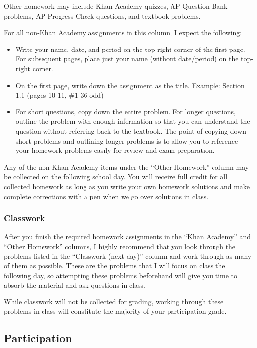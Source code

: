 \documentclass[12pt,fleqn]{article}
\begin{document}
Other homework may include Khan Academy quizzes, AP Question Bank problems, AP Progress Check questions, and textbook problems.

For all non-Khan Academy assignments in this column, I expect the following:

\begin{itemize}
\item
  Write your name, date, and period on the top-right corner of the first page. For subsequent pages, place just your name (without date/period) on the top-right corner.
\item
  On the first page, write down the assignment as the title. Example: Section 1.1 (pages 10-11, \#1-36 odd)
\item
  For short questions, copy down the entire problem. For longer questions, outline the problem with enough information so that you can understand the question without referring back to the textbook. The point of copying down short problems and outlining longer problems is to allow you to reference your homework problems easily for review and exam preparation.
\end{itemize}

Any of the non-Khan Academy items under the ``Other Homework'' column may be collected on the following school day. You will receive full credit for all collected homework as long as you write your own homework solutions and make complete corrections with a pen when we go over solutions in class.

\hypertarget{classwork}{%
\subsubsection{Classwork}\label{classwork}}

After you finish the required homework assignments in the ``Khan Academy'' and ``Other Homework'' columns, I highly recommend that you look through the problems listed in the ``Classwork (next day)'' column and work through as many of them as possible. These are the problems that I will focus on class the following day, so attempting these problems beforehand will give you time to absorb the material and ask questions in class.

While classwork will not be collected for grading, working through these problems in class will constitute the majority of your participation grade.

\hypertarget{participation}{%
\subsection{Participation}\label{participation}}
\end{document}
